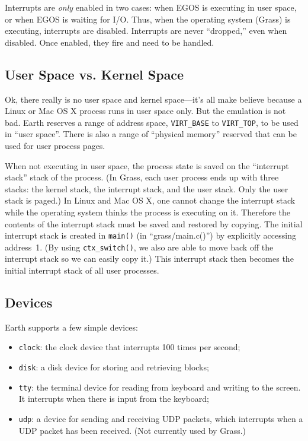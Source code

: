 \documentclass{article}
\begin{document}
Interrupts are \emph{only} enabled in two cases: when EGOS is executing
in user space, or when EGOS is waiting for I/O.  Thus, when the
operating system (Grass) is executing, interrupts are disabled.
Interrupts are never ``dropped,'' even when disabled.  Once enabled,
they fire and need to be handled.

\subsection{User Space vs. Kernel Space}

Ok, there really is no user space and kernel space---it's all make
believe because a Linux or Mac OS X process runs in user space only.
But the emulation is not bad.
Earth reserves a range of address space, \texttt{VIRT\_BASE} to
\texttt{VIRT\_TOP}, to be used in ``user space''.
There is also a range of ``physical memory'' reserved that can be
used for user process pages.

When not executing in user space, the process state is saved on the
``interrupt stack'' stack of the process.
(In Grass, each user process ends up with three stacks: the kernel
stack, the interrupt stack, and the user stack.  Only the user stack
is paged.)
In Linux and Mac OS X, one cannot change the interrupt stack while
the operating system thinks the process is executing on it.  Therefore
the contents of the interrupt stack must be saved and restored by
copying.
The initial interrupt stack is created in \texttt{main()}
(in ``grass/main.c()'') by explicitly accessing address~1.
(By using \texttt{ctx\_switch()}, we also are able to move back
off the interrupt stack so we can easily copy it.)
This interrupt stack then becomes the initial interrupt stack of
all user processes.

\subsection{Devices}

Earth supports a few simple devices:

\begin{itemize}
\item \texttt{clock}: the clock device that interrupts 100 times per second;
\item \texttt{disk}: a disk device for storing and retrieving blocks;
\item \texttt{tty}: the terminal device for reading from keyboard and writing to the screen.  It interrupts when there is input from the keyboard;
\item \texttt{udp}: a device for sending and receiving UDP packets, which
interrupts when a UDP packet has been received.  (Not currently used by Grass.)
\end{itemize}
\end{document}
